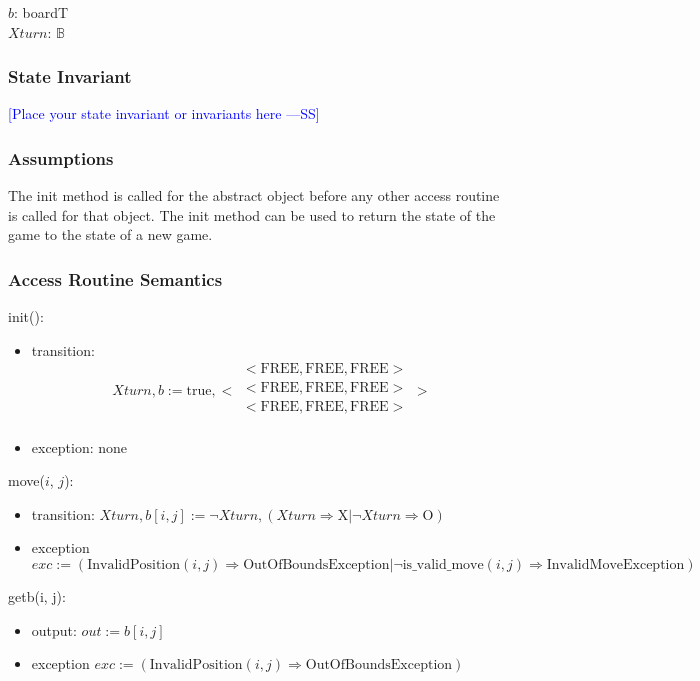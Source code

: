 \documentclass[12pt,fleqn]{examtst}
\newcommand{\authornote}[3]{\textcolor{#1}{[#3 ---#2]}}
\newcommand{\authornote}[3]{}
\newcommand{\wss}[1]{\authornote{blue}{SS}{#1}}
\begin{document}
$b$: boardT\\
$\mathit{Xturn}$: $\mathbb{B}$

\subsubsection* {State Invariant}

\wss{Place your state invariant or invariants here}\\

\subsubsection* {Assumptions}

The init method is called for the abstract object before any other access routine is called for that
object.  The init method can be used to return the state of the game to the state of a new game.

\subsubsection* {Access Routine Semantics}

init():
\begin{itemize}
\item transition: 
$$\mathit{Xturn}, b := \text{true}, 
< \begin{array}{c}
< \mbox{FREE}, \mbox{FREE}, \mbox{FREE} >\\
< \mbox{FREE}, \mbox{FREE}, \mbox{FREE} >\\
< \mbox{FREE}, \mbox{FREE}, \mbox{FREE} >\\
\end{array} >
$$
\item exception: none
\end{itemize}

\noindent move($i$, $j$):
\begin{itemize}
\item transition: $\mathit{Xturn}, b[i, j] := \neg \mathit{Xturn}, (\mathit{Xturn} \Rightarrow \mbox{X} | \neg
\mathit{Xturn} \Rightarrow \mbox{O})$
\item exception
$$exc := (\mbox{InvalidPosition}(i, j) \Rightarrow \mbox{OutOfBoundsException} | \neg \mbox{is\_valid\_move}(i, j)
\Rightarrow \mbox{InvalidMoveException})$$
\end{itemize}

\noindent getb(i, j):
\begin{itemize}
\item output: $\mathit{out} := b[i, j]$
\item exception
$exc := (\mbox{InvalidPosition}(i, j) \Rightarrow \mbox{OutOfBoundsException})$
\end{itemize}
\end{document}
